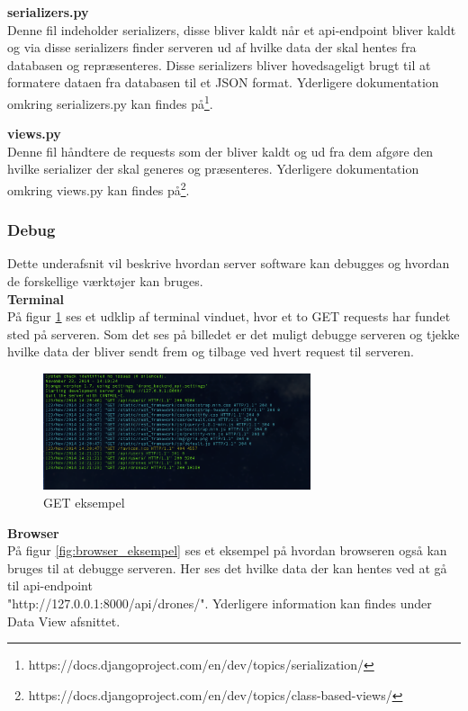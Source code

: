\textbf{serializers.py} \\
Denne fil indeholder serializers, disse bliver kaldt når et api-endpoint bliver kaldt og via disse serializers finder serveren ud af hvilke data der skal hentes fra databasen og repræsenteres. Disse serializers bliver hovedsageligt brugt til at formatere dataen fra databasen til et JSON format. Yderligere dokumentation omkring serializers.py kan findes på\footnote{https://docs.djangoproject.com/en/dev/topics/serialization/}.

\textbf{views.py} \\
Denne fil håndtere de requests som der bliver kaldt og ud fra dem afgøre den hvilke serializer der skal generes og præsenteres. Yderligere dokumentation omkring views.py kan findes på\footnote{https://docs.djangoproject.com/en/dev/topics/class-based-views/}.
\newpage

\subsubsection*{Debug}
Dette underafsnit vil beskrive hvordan server software kan debugges og hvordan de forskellige værktøjer kan bruges.\\

\textbf{Terminal}\\
På figur \ref{fig:get_eksempel} ses et udklip af terminal vinduet, hvor et to GET requests har fundet sted på serveren. Som det ses på billedet er det muligt debugge serveren og tjekke hvilke data der bliver sendt frem og tilbage ved hvert request til serveren. 

\begin{figure}[H]
	\centering
	\includegraphics[width=0.7\textwidth]{Billeder/implementation/get_eksempel.png}
	\caption{GET eksempel}
	\label{fig:get_eksempel}
\end{figure}

\textbf{Browser}\\
På figur \ref{fig:browser_eksempel} ses et eksempel på hvordan browseren også kan bruges til at debugge serveren. Her ses det hvilke data der kan hentes ved at gå til api-endpoint\\
"http://127.0.0.1:8000/api/drones/". Yderligere information kan findes under Data View afsnittet.

